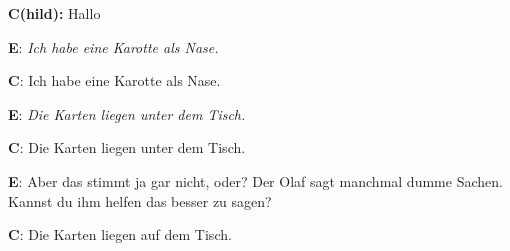 \documentclass[lucida]{sp} %
\begin{document}
\noindent \textbf{C(hild):} Hallo

\vspace{0.5em}

\noindent \textbf{E}: \textit{Ich habe eine Karotte als Nase.}

\vspace{0.5em}

\noindent \textbf{C}: Ich habe eine Karotte als Nase.

\vspace{0.5em}

\noindent \textbf{E}: \textit{Die Karten liegen unter dem Tisch.}

\vspace{0.5em}


\noindent \textbf{C}: Die Karten liegen unter dem Tisch.

\vspace{0.5em}


\noindent \textbf{E}: Aber das stimmt ja gar nicht, oder? Der Olaf sagt manchmal dumme Sachen. Kannst du ihm helfen das besser zu sagen?

\vspace{0.5em}

\noindent \textbf{C}: Die Karten liegen auf dem Tisch.




\end{document}
